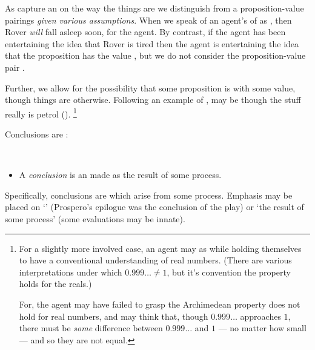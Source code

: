 \begin{note}
  As  capture an \agpe{} on the way the things are we distinguish  from a proposition-value pairings \emph{given various assumptions}.
  When we speak of an agent's \evalN{} of  as , then Rover \emph{will} fall asleep soon, for the agent.
  By contrast, if the agent has been entertaining the idea that Rover is tired then the agent is entertaining the idea that the proposition  has the value , but we do not consider the proposition-value pair .

  Further, we allow for the possibility that some proposition is  with some value, though things are otherwise.
  Following an example of \citeauthor{Williams:1979wi},  may be \eval{}  though the stuff really is petrol (\citeyear[18]{Williams:1979wi}).%
  \footnote{
    For a slightly more involved case, an agent may \eval{}  as  while holding themselves to have a conventional understanding of real numbers.
    (There are various interpretations under which \(0.999\dots \ne 1\), but it's convention the property holds for the reals.)

    For, the agent may have failed to grasp the Archimedean property does not hold for real numbers, and may think that, though \(0.999\dots\) approaches \(1\), there must be \emph{some} difference between \(0.999\dots\) and \(1\) --- no matter how small --- and so they are not equal.
  }
\end{note}

\begin{note}
  Conclusions are :

  \begin{definition}
    \label{assu:concluding:pvp}
    \mbox{ }
    \vspace{-\baselineskip}
    \begin{itemize}
    \item
      A \emph{conclusion} is an \evalN{} made as the result of some process.
    \end{itemize}
    \vspace{-\baselineskip}
  \end{definition}

  Specifically, conclusions are \evalN{} which arise from some process.
  Emphasis may be placed on `\evalN{}' (Prospero's epilogue was the conclusion of the play) or `the result of some process' (some evaluations may be innate).
\end{note}

